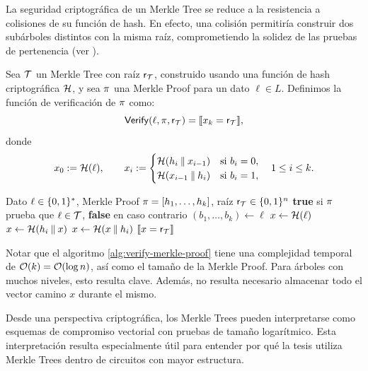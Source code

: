 La seguridad criptográfica de un Merkle Tree se reduce a la resistencia a colisiones de su función de hash. En efecto, una colisión permitiría construir dos subárboles distintos con la misma raíz, comprometiendo la solidez de las pruebas de pertenencia (ver \cite{hac,katz}).

\begin{definition}
\label{def:apendice-a-merkle-tree-funcion-de-verificacion-de-merkle-proof}
	Sea $\mathcal{T}$ un Merkle Tree con raíz $\mathsf{r}_{\mathcal{T}}$, construido usando una función de hash criptográfica $\mathcal{H}$, y sea $\pi$ una Merkle Proof para un dato $\ell \in L$. Definimos la función de verificación de $\pi$ como:
	$$\mathsf{Verify}(\ell, \pi, \mathsf{r}_{\mathcal{T}}) = \llbracket x_k = \mathsf{r}_{\mathcal{T}} \rrbracket,$$
	donde
	$$x_0 := \mathcal{H}(\ell), \qquad x_i := \begin{cases}
		\mathcal{H}(h_i \mathbin{\|} x_{i-1}) & \text{si } b_i = 0, \\
		\mathcal{H}(x_{i-1} \mathbin{\|} h_i) & \text{si } b_i = 1,
	\end{cases} \quad 1 \leq i \leq k.$$
\end{definition}

\begin{algorithm}[h]
	\caption{Verificación de una Merkle Proof}
	\label{alg:verify-merkle-proof}
	\begin{algorithmic}[1]
		\Require Dato $\ell \in \{0,1\}^{*}$, Merkle Proof $\pi = [h_1, \ldots, h_k]$, raíz $\mathsf{r}_{\mathcal{T}} \in \{0,1\}^{n}$
		\Ensure \textbf{true} si $\pi$ prueba que $\ell \in \mathcal{T}$, \textbf{false} en caso contrario
		\State $(b_1, \ldots, b_k) \gets \ell$ 
		\State $x \gets \mathcal{H}(\ell)$
		 
		\State $x \gets \mathcal{H}(h_i \mathbin{\|} x)$
		\Else {}
		\State $x \gets \mathcal{H}(x \mathbin{\|} h_i)$
		\EndIf
		\EndFor
		\State \Return $\llbracket x = \mathsf{r}_{\mathcal{T}} \rrbracket$
	\end{algorithmic}
\end{algorithm}

Notar que el algoritmo \ref{alg:verify-merkle-proof} tiene una complejidad temporal de $\mathcal{O}(k) = \mathcal{O}(\log n)$, así como el tamaño de la Merkle Proof. Para árboles con muchos niveles, esto resulta clave. Además, no resulta necesario almacenar todo el vector camino $x$ durante el mismo.

Desde una perspectiva criptográfica, los Merkle Trees pueden interpretarse como esquemas de compromiso vectorial \cite{Catalano2013} con pruebas de tamaño logarítmico. Esta interpretación resulta especialmente útil para entender por qué la tesis utiliza Merkle Trees dentro de circuitos con mayor estructura.
